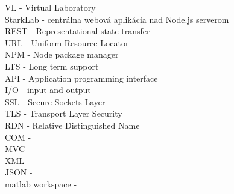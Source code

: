 VL - Virtual Laboratory\\
StarkLab - centrálna webová aplikácia nad Node.js serverom\\
REST - Representational state transfer\\
URL - Uniform Resource Locator\\
NPM - Node package manager\\
LTS - Long term support\\
API - Application programming interface\\
I/O - input and output\\
SSL - Secure Sockets Layer\\
TLS - Transport Layer Security\\
RDN - Relative Distinguished Name\\
COM - \\
MVC - \\
XML - \\
JSON - \\
matlab workspace - \\


